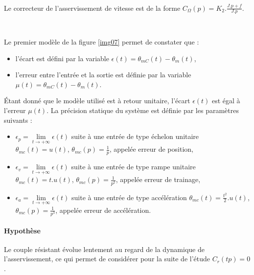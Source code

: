 ~\

Le correcteur de l'asservissement de vitesse est de la forme $C_\Omega(p)=K_2.\frac{J.p+f}{J.p}$.

~\

Le premier modèle de la figure \ref{img07} permet de constater que :
\begin{itemize}
 \item l'écart est défini par la variable $\epsilon(t)=\theta_{mC}(t)-\theta_m(t)$,
 \item l'erreur entre l'entrée et la sortie est définie par la variable $\mu(t)=\theta_{mC}(t)-\theta_m(t)$.
\end{itemize}

\newpage

Étant donné que le modèle utilisé est à retour unitaire, l'écart $\epsilon(t)$ est égal à l'erreur $\mu(t)$.
La précision statique du système est définie par les paramètres suivants :
\begin{itemize}
 \item $\epsilon_p=\lim\limits_{t \rightarrow +\infty}\epsilon(t)$ suite à une entrée de type échelon unitaire $\theta_{mc}(t)=u(t)$, $\theta_{mc}(p)=\frac{1}{p}$, appelée erreur de position,
 \item $\epsilon_v=\lim\limits_{t \rightarrow +\infty}\epsilon(t)$ suite à une entrée de type rampe unitaire $\theta_{mc}(t)=t.u(t)$, $\theta_{mc}(p)=\frac{1}{p^2}$, appelée erreur de trainage,
 \item $\epsilon_a=\lim\limits_{t \rightarrow +\infty}\epsilon(t)$ suite à une entrée de type accélération $\theta_{mc}(t)=\frac{t^2}{2}.u(t)$, $\theta_{mc}(p)=\frac{1}{p^3}$, appelée erreur de accélération.
\end{itemize}

\paragraph{Hypothèse}

Le couple résistant évolue lentement au regard de la dynamique de l'asservissement, ce qui permet de considérer pour la suite de l'étude $C_r(tp)=0$.



